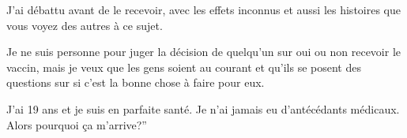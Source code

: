 J'ai débattu avant de le recevoir, avec les effets inconnus et aussi les
histoires que vous voyez des autres à ce sujet.

Je ne suis personne pour juger la décision de quelqu'un sur oui ou non recevoir
le vaccin, mais je veux que les gens soient au courant et qu'ils se posent des
questions sur si c'est la bonne chose à faire pour eux.

J'ai 19 ans et je suis en parfaite santé. Je n'ai jamais eu d'antécédants
médicaux. Alors pourquoi ça m'arrive?”


